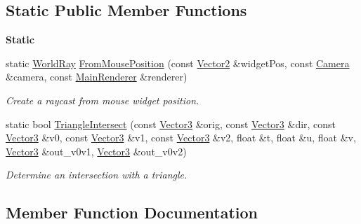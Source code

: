 \subsection*{Static Public Member Functions}
\begin{Indent}\textbf{ Static}\par
\begin{DoxyCompactItemize}
\item 
\mbox{\label{classrev_1_1_world_ray_afec02a46acff69f12467abe4910c264a}} 
static \mbox{\hyperlink{classrev_1_1_world_ray}{World\+Ray}} \mbox{\hyperlink{classrev_1_1_world_ray_afec02a46acff69f12467abe4910c264a}{From\+Mouse\+Position}} (const \mbox{\hyperlink{classrev_1_1_vector}{Vector2}} \&widget\+Pos, const \mbox{\hyperlink{classrev_1_1_camera}{Camera}} \&camera, const \mbox{\hyperlink{classrev_1_1_main_renderer}{Main\+Renderer}} \&renderer)
\begin{DoxyCompactList}\small\item\em Create a raycast from mouse widget position. \end{DoxyCompactList}\item 
static bool \mbox{\hyperlink{classrev_1_1_world_ray_a42a5fcd774d2a5d62128de43d047c393}{Triangle\+Intersect}} (const \mbox{\hyperlink{classrev_1_1_vector}{Vector3}} \&orig, const \mbox{\hyperlink{classrev_1_1_vector}{Vector3}} \&dir, const \mbox{\hyperlink{classrev_1_1_vector}{Vector3}} \&v0, const \mbox{\hyperlink{classrev_1_1_vector}{Vector3}} \&v1, const \mbox{\hyperlink{classrev_1_1_vector}{Vector3}} \&v2, float \&t, float \&u, float \&v, \mbox{\hyperlink{classrev_1_1_vector}{Vector3}} \&out\+\_\+v0v1, \mbox{\hyperlink{classrev_1_1_vector}{Vector3}} \&out\+\_\+v0v2)
\begin{DoxyCompactList}\small\item\em Determine an intersection with a triangle. \end{DoxyCompactList}\end{DoxyCompactItemize}
\end{Indent}


\subsection{Member Function Documentation}
\mbox{\label{classrev_1_1_world_ray_a53604bdab9b5945098cc81a3cc84cc1d}} 
